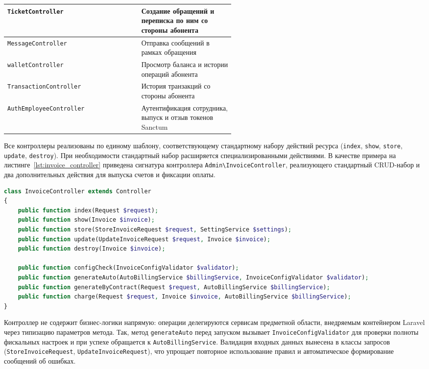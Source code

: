 \begin{xltabular}{\textwidth}{|>{\centering\arraybackslash}m{0.32\linewidth}|>{\centering\arraybackslash}m{0.22\linewidth}|X|}
\texttt{TicketController} &  & Создание обращений и переписка по ним со стороны абонента \\ \hline
\texttt{MessageController} &  & Отправка сообщений в рамках обращения \\ \hline
\texttt{walletController} &  & Просмотр баланса и истории операций абонента \\ \hline
\texttt{TransactionController} &  & История транзакций со стороны абонента \\ \hline
\texttt{AuthEmployeeController} &  & Аутентификация сотрудника, выпуск и отзыв токенов Sanctum \\ \hline
\end{xltabular}

Все контроллеры реализованы по единому шаблону, соответствующему стандартному набору действий ресурса (\texttt{index}, \texttt{show}, \texttt{store}, \texttt{update}, \texttt{destroy}). При необходимости стандартный набор расширяется специализированными действиями. В качестве примера на листинге~\ref{lst:invoice_controller} приведена сигнатура контроллера \texttt{Admin\textbackslash InvoiceController}, реализующего стандартный CRUD-набор и два дополнительных действия для выпуска счетов и фиксации оплаты.

\begin{lstlisting}[language=PHP,caption={Сокращенная сигнатура контроллера \texttt{Admin\textbackslash InvoiceController}},label={lst:invoice_controller}]
class InvoiceController extends Controller
{
    public function index(Request $request);
    public function show(Invoice $invoice);
    public function store(StoreInvoiceRequest $request, SettingService $settings);
    public function update(UpdateInvoiceRequest $request, Invoice $invoice);
    public function destroy(Invoice $invoice);

    public function configCheck(InvoiceConfigValidator $validator);
    public function generateAuto(AutoBillingService $billingService, InvoiceConfigValidator $validator);
    public function generateByContract(Request $request, AutoBillingService $billingService);
    public function charge(Request $request, Invoice $invoice, AutoBillingService $billingService);
}
\end{lstlisting}

Контроллер не содержит бизнес-логики напрямую: операции делегируются сервисам предметной области, внедряемым контейнером Laravel через типизацию параметров метода. Так, метод \texttt{generateAuto} перед запуском вызывает \texttt{InvoiceConfigValidator} для проверки полноты фискальных настроек и при успехе обращается к \texttt{AutoBillingService}. Валидация входных данных вынесена в классы запросов (\texttt{StoreInvoiceRequest}, \texttt{UpdateInvoiceRequest}), что упрощает повторное использование правил и автоматическое формирование сообщений об ошибках.

